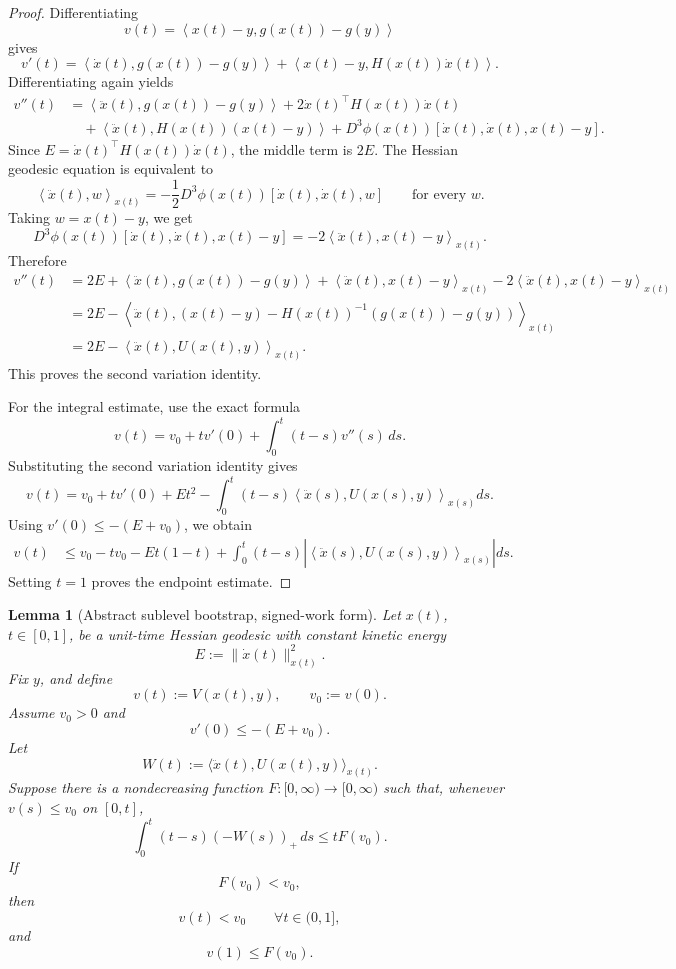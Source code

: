 \documentclass[11pt]{article}
\newtheorem{lemma}{Lemma}
\newcommand{\ip}[2]{\left\langle #1,#2\right\rangle}
\begin{document}
\begin{proof}
Differentiating
\[
    v(t)=\ip{x(t)-y}{g(x(t))-g(y)}
\]
gives
\[
    v'(t)=
    \ip{\dot x(t)}{g(x(t))-g(y)}+
    \ip{x(t)-y}{H(x(t))\dot x(t)}.
\]
Differentiating again yields
\[
\begin{aligned}
    v''(t)
    &=
    \ip{\ddot x(t)}{g(x(t))-g(y)}
    +2\dot x(t)^\top H(x(t))\dot x(t) \\
    &\quad+
    \ip{\ddot x(t)}{H(x(t))(x(t)-y)}
    +D^3\phi(x(t))[\dot x(t),\dot x(t),x(t)-y].
\end{aligned}
\]
Since \(E=\dot x(t)^\top H(x(t))\dot x(t)\), the middle term is \(2E\). The Hessian geodesic equation is equivalent to
\[
    \ip{\ddot x(t)}{w}_{x(t)}
    =
    -\frac12D^3\phi(x(t))[\dot x(t),\dot x(t),w]
    \qquad \text{for every }w.
\]
Taking \(w=x(t)-y\), we get
\[
    D^3\phi(x(t))[\dot x(t),\dot x(t),x(t)-y]
    =
    -2\ip{\ddot x(t)}{x(t)-y}_{x(t)}.
\]
Therefore
\[
\begin{aligned}
    v''(t)
    &=
    2E+
    \ip{\ddot x(t)}{g(x(t))-g(y)}
    +\ip{\ddot x(t)}{x(t)-y}_{x(t)}
    -2\ip{\ddot x(t)}{x(t)-y}_{x(t)} \\
    &=
    2E-
    \ip{\ddot x(t)}{(x(t)-y)-H(x(t))^{-1}(g(x(t))-g(y))}_{x(t)} \\
    &=
    2E-
    \ip{\ddot x(t)}{U(x(t),y)}_{x(t)}.
\end{aligned}
\]
This proves the second variation identity.

For the integral estimate, use the exact formula
\[
    v(t)=v_0+tv'(0)+\int_0^t(t-s)v''(s)\,ds.
\]
Substituting the second variation identity gives
\[
    v(t)=v_0+tv'(0)+Et^2-
    \int_0^t(t-s)\ip{\ddot x(s)}{U(x(s),y)}_{x(s)}ds.
\]
Using \(v'(0)\le -(E+v_0)\), we obtain
\[
\begin{aligned}
    v(t)
    &\le
    v_0-tv_0-Et(1-t)
    +
    \int_0^t(t-s)
    \left|
    \ip{\ddot x(s)}{U(x(s),y)}_{x(s)}
    \right|ds.
\end{aligned}
\]
Setting \(t=1\) proves the endpoint estimate.
\end{proof}


\begin{lemma}[Abstract sublevel bootstrap, signed-work form]
Let \(x(t)\), \(t\in[0,1]\), be a unit-time Hessian geodesic with constant
kinetic energy
\[
    E:=\|\dot x(t)\|_{x(t)}^2.
\]
Fix \(y\), and define
\[
    v(t):=V(x(t),y),
    \qquad
    v_0:=v(0).
\]
Assume \(v_0>0\) and
\[
    v'(0)\le -(E+v_0).
\]
Let
\[
    W(t):=\langle \ddot x(t),U(x(t),y)\rangle_{x(t)}.
\]
Suppose there is a nondecreasing function \(F:[0,\infty)\to[0,\infty)\)
such that, whenever \(v(s)\le v_0\) on \([0,t]\),
\[
    \int_0^t (t-s)(-W(s))_+\,ds
    \le
    tF(v_0).
\]
If
\[
    F(v_0)<v_0,
\]
then
\[
    v(t)<v_0
    \qquad
    \forall t\in(0,1],
\]
and
\[
    v(1)\le F(v_0).
\]
\end{lemma}
\end{document}
